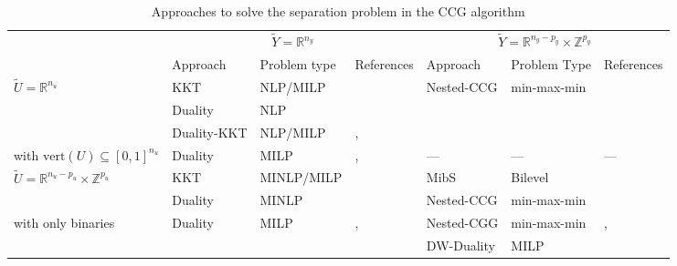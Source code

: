 
\renewcommand{\arraystretch}{1.3} %
\begin{sidewaystable}
    \vspace{12cm}
    \caption{Approaches to solve the separation problem in the CCG algorithm}
    \centering
    \begin{tabular}{lllp{4cm}llp{4cm}}
        \toprule
        & \multicolumn{3}{c}{$\tilde{Y} = \mathbb{R}^{n_y}$} & \multicolumn{3}{c}{$\tilde{Y} = \mathbb{R}^{n_y - p_y}\times\mathbb{Z}^{p_y}$} \\\cmidrule(lr){2-4}\cmidrule(lr){5-7}
        & Approach & Problem type & References & Approach & Problem Type & References \\\toprule
        $\tilde{U}=\mathbb{R}^{n_u}$ & KKT & NLP/MILP & \textcite{Zeng2013} & Nested-CCG & min-max-min & \textcite{zeng2012exact} \\
        & Duality & NLP & \textcite{Zeng2013} \\
        & Duality-KKT & NLP/MILP & \textcite{Ayoub2016}, \textcite{lefebvre2022convex} & & \\[0.5ex]\hdashline{}
        with $\text{vert}(U) \subseteq [0,1]^{n_u}$ & Duality & MILP & \textcite{Ayoub2016}, \textcite{lefebvre2022convex} & --- & --- & --- \\\midrule
        $\tilde{U}=\mathbb{R}^{n_u-p_u}\times\mathbb{Z}^{p_u}$ & KKT & MINLP/MILP & \textcite{Zeng2013} & \textsf{MibS} & Bilevel & \textcite{Tahernejad2020} \\
        & Duality & MINLP & \textcite{Zeng2013} & Nested-CCG & min-max-min & \textcite{zeng2012exact} \\[0.5ex]\hdashline{}
        with only binaries & Duality & MILP & \textcite{Ayoub2016}, \textcite{lefebvre2022convex} & Nested-CGG & min-max-min & \textcite{Subramanyam2022}, \textcite{lefebvre2025correctiontolagrangiandual} \\
        & & & & DW-Duality & MILP & \textcite{pfetsch2021generic} \\\bottomrule 
    \end{tabular}
\end{sidewaystable}
\renewcommand{\arraystretch}{1.0}

